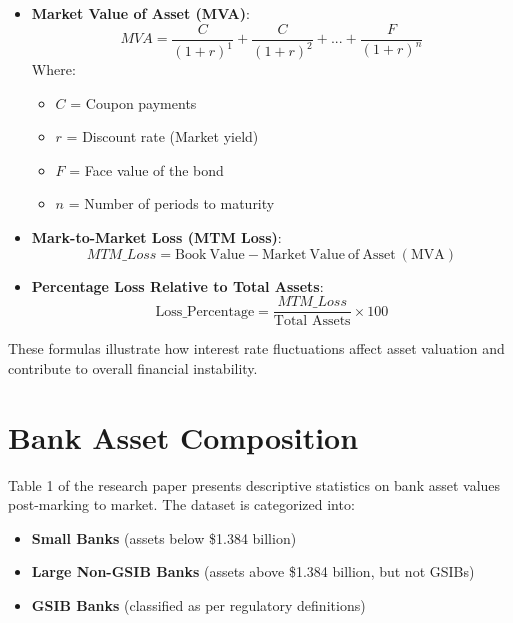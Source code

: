 \documentclass{article}
\begin{document}
\begin{itemize}
    \item \textbf{Market Value of Asset (MVA)}: 
    \begin{equation}
        MVA = \frac{C}{(1+r)^1} + \frac{C}{(1+r)^2} + ... + \frac{F}{(1+r)^n}
    \end{equation}
    Where:
    \begin{itemize}
        \item \( C \) = Coupon payments
        \item \( r \) = Discount rate (Market yield)
        \item \( F \) = Face value of the bond
        \item \( n \) = Number of periods to maturity
    \end{itemize}
    
    \item \textbf{Mark-to-Market Loss (MTM Loss)}:
    \begin{equation}
        MTM\_Loss = \mathrm{Book\ Value} - \mathrm{Market\ Value\ of\ Asset\ (MVA)}
    \end{equation}
    
    \item \textbf{Percentage Loss Relative to Total Assets}:
    \begin{equation}
        \text{Loss\_Percentage} = \frac{MTM\_Loss}{\text{Total Assets}} \times 100
    \end{equation}
\end{itemize}

These formulas illustrate how interest rate fluctuations affect asset valuation and contribute to overall financial instability.

\section{Bank Asset Composition}
Table 1 of the research paper presents descriptive statistics on bank asset values post-marking to market. The dataset is categorized into:

\begin{itemize}
    \item \textbf{Small Banks} (assets below \$1.384 billion)
    \item \textbf{Large Non-GSIB Banks} (assets above \$1.384 billion, but not GSIBs)
    \item \textbf{GSIB Banks} (classified as per regulatory definitions)
\end{itemize}
\end{document}
